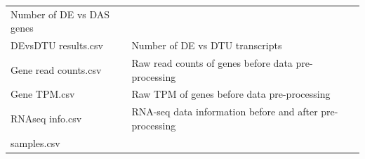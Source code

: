 \documentclass[]{article}
\begin{document}
\begin{longtable}[]{@{}lll@{}}
\begin{minipage}[t]{0.65\columnwidth}
Number of DE vs DAS genes\strut
\end{minipage} & \begin{minipage}[t]{0.02\columnwidth}\raggedright\strut
\strut
\end{minipage}\tabularnewline
\begin{minipage}[t]{0.25\columnwidth}\raggedright\strut
DEvsDTU results.csv\strut
\end{minipage} & \begin{minipage}[t]{0.65\columnwidth}\raggedright\strut
Number of DE vs DTU transcripts\strut
\end{minipage} & \begin{minipage}[t]{0.02\columnwidth}\raggedright\strut
\strut
\end{minipage}\tabularnewline
\begin{minipage}[t]{0.25\columnwidth}\raggedright\strut
Gene read counts.csv\strut
\end{minipage} & \begin{minipage}[t]{0.65\columnwidth}\raggedright\strut
Raw read counts of genes before data pre-processing\strut
\end{minipage} & \begin{minipage}[t]{0.02\columnwidth}\raggedright\strut
\strut
\end{minipage}\tabularnewline
\begin{minipage}[t]{0.25\columnwidth}\raggedright\strut
Gene TPM.csv\strut
\end{minipage} & \begin{minipage}[t]{0.65\columnwidth}\raggedright\strut
Raw TPM of genes before data pre-processing\strut
\end{minipage} & \begin{minipage}[t]{0.02\columnwidth}\raggedright\strut
\strut
\end{minipage}\tabularnewline
\begin{minipage}[t]{0.25\columnwidth}\raggedright\strut
RNAseq info.csv\strut
\end{minipage} & \begin{minipage}[t]{0.65\columnwidth}\raggedright\strut
RNA-seq data information before and after pre-processing\strut
\end{minipage} & \begin{minipage}[t]{0.02\columnwidth}\raggedright\strut
\strut
\end{minipage}\tabularnewline
\begin{minipage}[t]{0.25\columnwidth}\raggedright\strut
samples.csv\strut
\end{minipage} & \begin{minipage}[t]{0.65\columnwidth}\raggedright\strut

\end{minipage}
\end{longtable}
\end{document}
